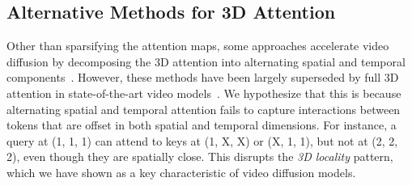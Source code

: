 \subsection{Alternative Methods for 3D Attention}
Other than sparsifying the attention maps, some approaches accelerate video diffusion by decomposing the 3D attention into alternating spatial and temporal components~\citep{singer2022makeavideotexttovideogenerationtextvideo, wang2023lavie, chen2023videocrafter1opendiffusionmodels, ma2024latte}. However, these methods have been largely superseded by full 3D attention in state-of-the-art video models~\citep{opensora,lin2024open, genmo2024mochi, kong2025hunyuanvideosystematicframeworklarge}. We hypothesize that this is because alternating spatial and temporal attention fails to capture interactions between tokens that are offset in both spatial and temporal dimensions. For instance, a query at (1, 1, 1) can attend to keys at (1, X, X) or (X, 1, 1), but not at (2, 2, 2), even though they are spatially close. This disrupts the \textit{3D locality} pattern, which we have shown as a key characteristic of video diffusion models.




